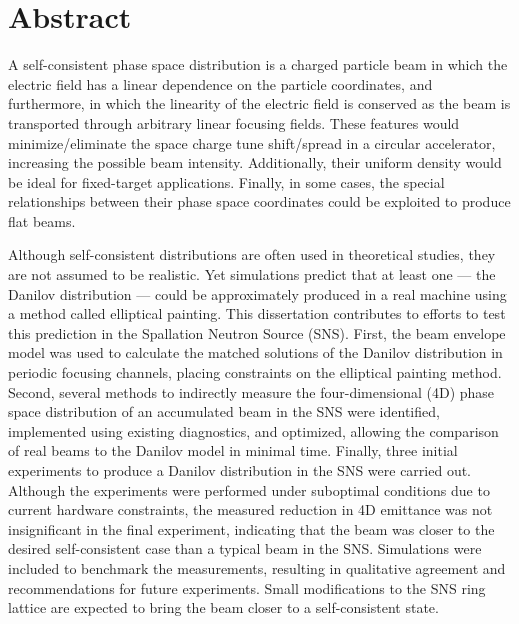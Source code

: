 \chapter*{Abstract} 

A self-consistent phase space distribution is a charged particle beam in which the electric field has a linear dependence on the particle coordinates, and furthermore, in which the linearity of the electric field is conserved as the beam is transported through arbitrary linear focusing fields. These features would minimize/eliminate the space charge tune shift/spread in a circular accelerator, increasing the possible beam intensity. Additionally, their uniform density would be ideal for fixed-target applications. Finally, in some cases, the special relationships between their phase space coordinates could be exploited to produce flat beams. 

Although self-consistent distributions are often used in theoretical studies, they are not assumed to be realistic. Yet simulations predict that at least one — the Danilov distribution — could be approximately produced in a real machine using a method called elliptical painting. This dissertation contributes to efforts to test this prediction in the Spallation Neutron Source (SNS). First, the beam envelope model was used to calculate the matched solutions of the Danilov distribution in periodic focusing channels, placing constraints on the elliptical painting method. Second, several methods to indirectly measure the four-dimensional (4D) phase space distribution of an accumulated beam in the SNS were identified, implemented using existing diagnostics, and optimized, allowing the comparison of real beams to the Danilov model in minimal time. Finally, three initial experiments to produce a Danilov distribution in the SNS were carried out. Although the experiments were performed under suboptimal conditions due to current hardware constraints, the measured reduction in 4D emittance was not insignificant in the final experiment, indicating that the beam was closer to the desired self-consistent case than a typical beam in the SNS. Simulations were included to benchmark the measurements, resulting in qualitative agreement and recommendations for future experiments. Small modifications to the SNS ring lattice are expected to bring the beam closer to a self-consistent state.
